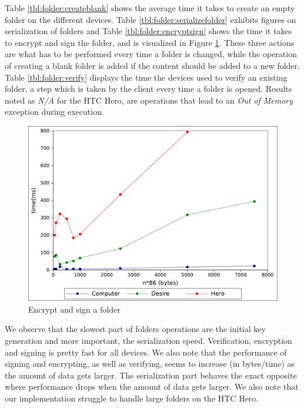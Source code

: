 \documentclass[pdftex,english,10pt,b5paper,twoside]{book}
\begin{document}
Table \ref{tbl:folder:createblank} shows the average time it takes to create an
empty folder on the different devices. Table \ref{tbl:folder:serializefolder}
exhibits figures on serialization of folders and Table
\ref{tbl:folder:encryptsign} shows the time it takes to encrypt and sign the
folder, and is visualized in Figure \ref{fig:results:signencrypt}. These three
actions are what has to be performed every time a folder is changed, while the
operation of creating a blank folder is added if the content should be added to
a new folder. Table \ref{tbl:folder:verify} displays the time the devices used
to verify an existing folder, a step which is taken by the client every time a
folder is opened. Results noted as \emph{N/A} for the HTC Hero, are operations
that lead to an \emph{Out of Memory} exception during execution.




\begin{figure}[h!]
    \centering
    \includegraphics[scale=0.6]{graph_signandencrypt.pdf}
    \caption{Encrypt and sign a folder}
    \label{fig:results:signencrypt}
\end{figure}


We observe that the slowest part of folders operations are the initial key
generation and more important, the serialization speed. Verification,
encryption and signing is pretty fast for all devices. We also note that the
performance of signing and encrypting, as well as verifying, seems to increase
(in bytes/time) as the amount of data gets larger. The serialization part
behaves the exact opposite where performance drops when the amount of data gets
larger. We also note that our implementation struggle to handle large folders
on the HTC Hero.
\end{document}
